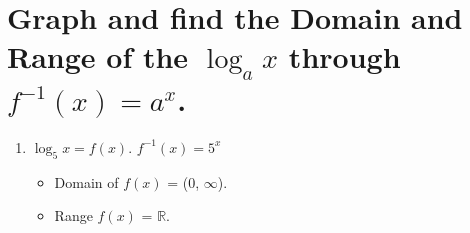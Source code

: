 \documentclass[16pt]{article}
\begin{document}
\section{Graph and find the Domain and Range of the \(\log _{a} x\) through \(f^{-1}(x) = a^x\).}
    \begin{enumerate} \begin{enumerate} \begin{enumerate}
    \item \(\log _5 x = f(x).\) \(f^{-1}(x) = 5^x\)
    \begin{itemize}
        \item Domain of \(f(x)\) = (0, \(\infty\)).
        \item Range \(f(x)\) = \(\mathbb{R}\).
    \end{itemize}
    \end{enumerate} \end{enumerate} \end{enumerate}
\end{document}
